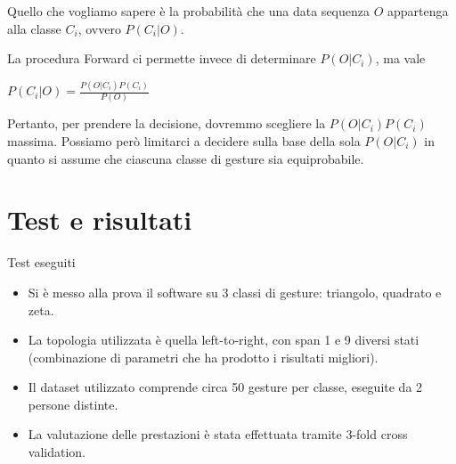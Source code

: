 \documentclass[hyperref={pdfpagelabels=false},slidestop,mathserif,red]{beamer}
\begin{document}
\begin{frame}
\begin{block}{}
 Quello che vogliamo sapere \`e la probabilit\`a che una data sequenza $O$ appartenga alla classe $C_{i}$, ovvero $P(C_{i}|O)$.
\end{block}
\begin{block}{}
 La procedura Forward ci permette invece di determinare $P(O|C_{i})$, ma vale
\begin{center}$P(C_{i}|O) = \frac{P(O|C_{i})P(C_{i})}{P(O)}$\end{center}
\end{block}
\begin{block}{}
 Pertanto, per prendere la decisione, dovremmo scegliere la $P(O|C_{i})P(C_{i})$ massima. Possiamo per\`o limitarci a decidere sulla base della sola $P(O|C_{i})$ in quanto si assume che ciascuna classe di gesture sia equiprobabile.
\end{block}
\end{frame}

\section{Test e risultati}

\begin{frame}{Test eseguiti}
\begin{block}{}
\begin{itemize}
\item Si \`e messo alla prova il software su 3 classi di gesture: triangolo, quadrato e zeta.
\item La topologia utilizzata \`e quella left-to-right, con span 1 e 9 diversi stati (combinazione di parametri che ha prodotto i risultati migliori).
\item Il dataset utilizzato comprende circa 50 gesture per classe, eseguite da 2 persone distinte.
\item La valutazione delle prestazioni \`e stata effettuata tramite 3-fold cross validation.
\end{itemize}

\end{block}
\end{frame}
\end{document}
